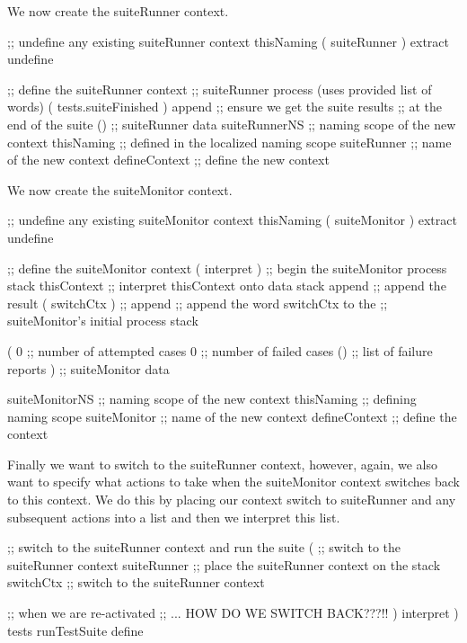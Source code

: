 We now create the suiteRunner context.

\startJoylolCode
  ;; undefine any existing suiteRunner context
  thisNaming
  ( suiteRunner ) extract
  undefine

  ;; define the suiteRunner context
                ;; suiteRunner process (uses provided list of words)
  ( tests.suiteFinished )
  append        ;; ensure we get the suite results
                ;; at the end of the suite
  ()            ;; suiteRunner data
  suiteRunnerNS ;; naming scope of the new context
  thisNaming    ;; defined in the localized naming scope
  suiteRunner   ;; name of the new context
  defineContext ;; define the new context
\stopJoylolCode

We now create the suiteMonitor context.

\startJoylolCode
  ;; undefine any existing suiteMonitor context
  thisNaming
  ( suiteMonitor ) extract
  undefine

  ;; define the suiteMonitor context
  ( interpret )   ;; begin the suiteMonitor process stack
  thisContext     ;; interpret thisContext onto data stack
  append          ;; append the result
  ( switchCtx )   ;;
  append          ;; append the word switchCtx to the 
                  ;; suiteMonitor's initial process stack
  
  (
    0             ;; number of attempted cases
    0             ;; number of failed cases
    ()            ;; list of failure reports
  )               ;; suiteMonitor data
  
  suiteMonitorNS  ;; naming scope of the new context
  thisNaming      ;; defining naming scope
  suiteMonitor    ;; name of the new context
  defineContext   ;; define the context
\stopJoylolCode

Finally we want to switch to the suiteRunner context, however, again, we 
also want to specify what actions to take when the suiteMonitor context 
switches back to this context. We do this by placing our context switch to 
suiteRunner and any subsequent actions into a list and then we interpret 
this list. 

\startJoylolCode
  ;; switch to the suiteRunner context and run the suite
  (
    ;; switch to the suiteRunner context
    suiteRunner ;; place the suiteRunner context on the stack
    switchCtx   ;; switch to the suiteRunner context
    
    ;; when we are re-activated
    ;; ... HOW DO WE SWITCH BACK???!!
  )
  interpret
)
tests
runTestSuite
define
\stopJoylolCode

